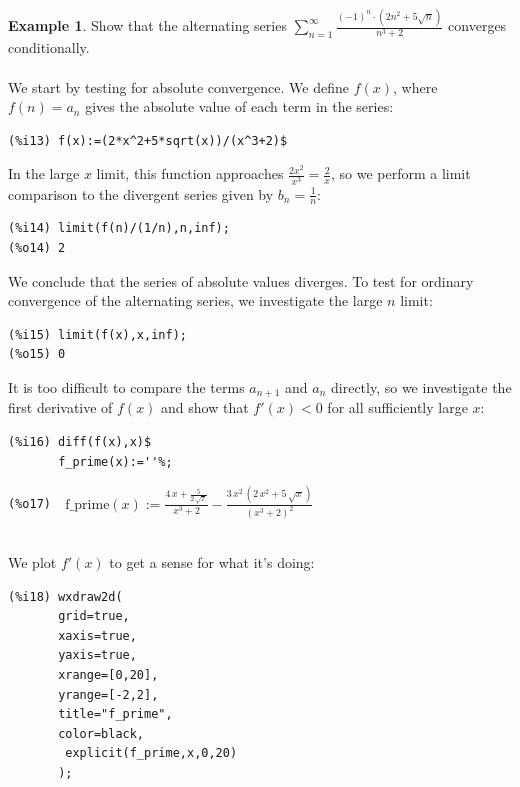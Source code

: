 \documentclass[10.5pt,twoside]{report}
\theoremstyle{definition}
\newtheorem{exmp}{Example}[section]
\begin{document}
\begin{exmp} Show that the alternating series $ \sum_{n=1}^{\infty} \frac{(-1)^n\cdot (2n^2+5\sqrt{n})}{n^3+2}$ converges conditionally.  \\

${}$\\

We start by testing for absolute convergence.  We define $f(x)$, where $f(n)=a_n$ gives the absolute value of each term in the series:

\begin{verbatim}
(%i13) f(x):=(2*x^2+5*sqrt(x))/(x^3+2)$
\end{verbatim}

In the large $x$ limit, this function approaches $\frac{2x^2}{x^3}=\frac{2}{x}$, so we perform a limit comparison to the divergent series given by $b_n=\frac{1}{n}$:

\begin{verbatim}
(%i14) limit(f(n)/(1/n),n,inf);
(%o14) 2
\end{verbatim}

We conclude that the series of absolute values diverges.  To test for ordinary convergence of the alternating series, we investigate the large $n$ limit:\\

\begin{verbatim}
(%i15) limit(f(x),x,inf);
(%o15) 0
\end{verbatim}

It is too difficult to compare the terms $a_{n+1}$ and $a_n$ directly, so we investigate the first derivative of $f(x)$ and show that $f'(x)<0$ for all sufficiently large $x$:

\begin{verbatim}
(%i16) diff(f(x),x)$
       f_prime(x):=''%;
\end{verbatim}
\verb|(%o17)  |$\mathrm{f\_prime}\left( x\right) :=\frac{4\,x+\frac{5}{2\,\sqrt{x}}}{{x}^{3}+2}-\frac{3\,{x}^{2}\,\left( 2\,{x}^{2}+5\,\sqrt{x}\right) }{{\left( {x}^{3}+2\right) }^{2}}$

${}$\\

We plot $f'(x)$ to get a sense for what it's doing:

\begin{verbatim}
(%i18) wxdraw2d(
       grid=true,
       xaxis=true,
       yaxis=true,
       xrange=[0,20],
       yrange=[-2,2],
       title="f_prime",
       color=black,
        explicit(f_prime,x,0,20)
       );
\end{verbatim}


\end{exmp}
\end{document}
